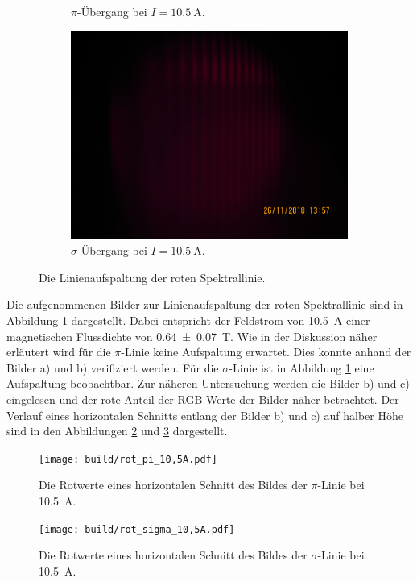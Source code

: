 \begin{figure}
\begin{subfigure}{.32\textwidth}
    \caption{$\pi$-Übergang bei $I = \SI{10.5}{\ampere}.$}
  \end{subfigure}
  \begin{subfigure}{.32\textwidth}
    \centering
    \includegraphics[width=\textwidth]{rohdaten/rot_sigma_10,5A.JPG}
    \caption{$\sigma$-Übergang bei $I = \SI{10.5}{\ampere}.$}
  \end{subfigure}
  \caption{Die Linienaufspaltung der roten Spektrallinie.}
  \label{fig:AuswRot}
\end{figure}

Die aufgenommenen Bilder zur Linienaufspaltung der roten Spektrallinie sind in
Abbildung \ref{fig:AuswRot} dargestellt.
Dabei entspricht der Feldstrom von \SI{10.5}{\ampere} einer magnetischen
Flussdichte von \SI{0.64(7)}{\tesla}.
Wie in der Diskussion näher erläutert wird für die $\pi$-Linie keine Aufspaltung
erwartet. Dies konnte anhand der Bilder a) und b) verifiziert werden.
Für die $\sigma$-Linie ist in Abbildung \ref{fig:AuswRot} eine Aufspaltung
beobachtbar.
Zur näheren Untersuchung werden die Bilder b) und c) eingelesen und der rote
Anteil der RGB-Werte der Bilder näher betrachtet.
Der Verlauf eines horizontalen Schnitts entlang der Bilder b) und c) auf halber
Höhe sind in den Abbildungen \ref{fig:RotSigmaSchnitt}
und \ref{fig:RotPiSchnitt} dargestellt.

\begin{figure}
  \centering
  \texttt{[image: build/rot\_pi\_10,5A.pdf]}
  \caption{Die Rotwerte eines horizontalen Schnitt des Bildes der
    $\pi$-Linie bei \SI{10.5}{\ampere}.}
  \label{fig:RotSigmaSchnitt}
\end{figure}
\begin{figure}
  \centering
  \texttt{[image: build/rot\_sigma\_10,5A.pdf]}
  \caption{Die Rotwerte eines horizontalen Schnitt des Bildes der
    $\sigma$-Linie bei \SI{10.5}{\ampere}.}
  \label{fig:RotPiSchnitt}
\end{figure}

